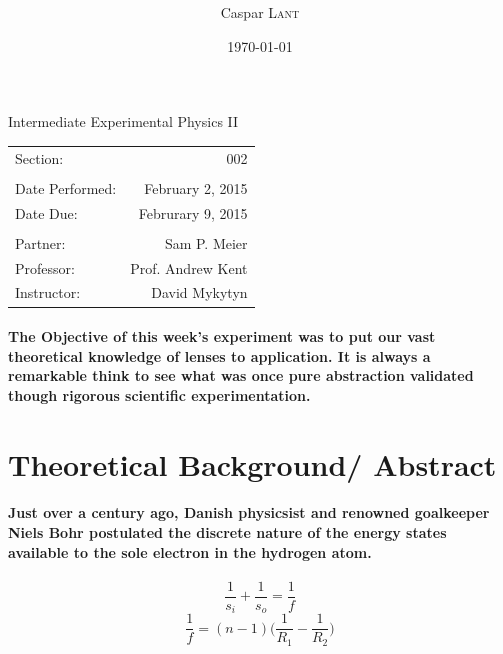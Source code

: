\documentclass{amsart}
\title{      }
\author{Caspar \textsc{Lant}} %
\date{\today} %
\begin{document}
\bigskip

\maketitle %
\begin{center}

Intermediate Experimental Physics II\\
\vspace{1.5cm}

\begin{tabular}{l r}

Section: & 002\\
\\
Date Performed: & February 2, 2015 \\ %
Date Due: & Februrary 9, 2015\\
\\
Partner: & Sam P. Meier \\ %
Professor: & Prof. Andrew Kent\\
Instructor: & David Mykytyn %
\end{tabular}
\end{center}
\vspace{50mm}
\pagebreak

\paragraph{\textbf{The Objective} of this week's experiment was to put our vast theoretical knowledge of lenses to application. It is always a remarkable think to see what was once pure abstraction validated though rigorous scientific experimentation. }

\section{Theoretical Background/ Abstract}
\paragraph{Just over a century ago, Danish physicsist and renowned goalkeeper Niels Bohr postulated the discrete nature of the energy states available to the sole electron in the hydrogen atom. }
\begin{equation}
\frac{1}{s_i}+ \frac{1}{s_o} = \frac{1}{f}
\end{equation}
\begin{equation}
\frac{1}{f} = (n-1)\Big(\frac{1}{R_1} - \frac{1}{R_2}\Big)
\end{equation}
\end{document}

